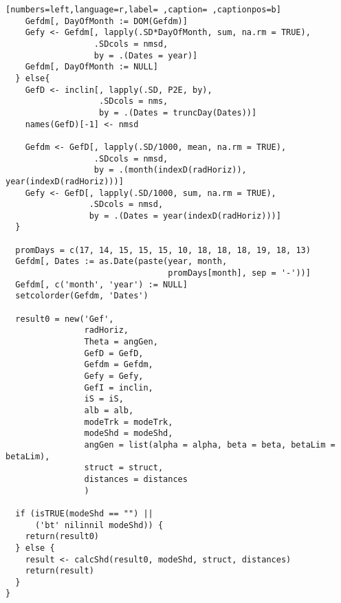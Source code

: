 \begin{lstlisting}[numbers=left,language=r,label= ,caption= ,captionpos=b]
    Gefdm[, DayOfMonth := DOM(Gefdm)]
    Gefy <- Gefdm[, lapply(.SD*DayOfMonth, sum, na.rm = TRUE),
                  .SDcols = nmsd,
                  by = .(Dates = year)]
    Gefdm[, DayOfMonth := NULL]
  } else{
    GefD <- inclin[, lapply(.SD, P2E, by),
                   .SDcols = nms,
                   by = .(Dates = truncDay(Dates))]
    names(GefD)[-1] <- nmsd

    Gefdm <- GefD[, lapply(.SD/1000, mean, na.rm = TRUE),
                  .SDcols = nmsd,
                  by = .(month(indexD(radHoriz)), year(indexD(radHoriz)))]
    Gefy <- GefD[, lapply(.SD/1000, sum, na.rm = TRUE),
                 .SDcols = nmsd,
                 by = .(Dates = year(indexD(radHoriz)))]
  }

  promDays = c(17, 14, 15, 15, 15, 10, 18, 18, 18, 19, 18, 13)
  Gefdm[, Dates := as.Date(paste(year, month,
                                 promDays[month], sep = '-'))]
  Gefdm[, c('month', 'year') := NULL]
  setcolorder(Gefdm, 'Dates')

  result0 = new('Gef',
                radHoriz,                           
                Theta = angGen,
                GefD = GefD,
                Gefdm = Gefdm,
                Gefy = Gefy,
                GefI = inclin,
                iS = iS,
                alb = alb,
                modeTrk = modeTrk,
                modeShd = modeShd,
                angGen = list(alpha = alpha, beta = beta, betaLim = betaLim),
                struct = struct,
                distances = distances
                )

  if (isTRUE(modeShd == "") ||        
      ('bt' nilinnil modeShd)) {            
    return(result0)
  } else {
    result <- calcShd(result0, modeShd, struct, distances)
    return(result)
  }
}
\end{lstlisting}

